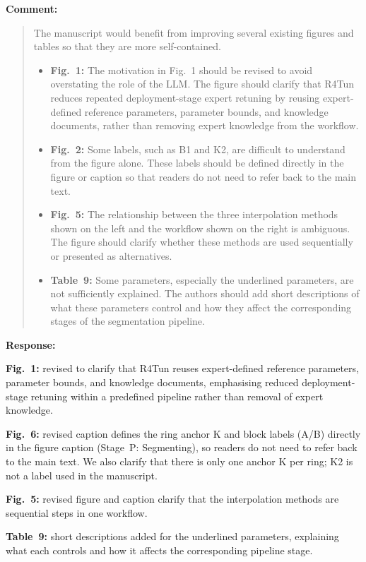 \documentclass[11pt,a4paper]{article}
\newcommand{\MSCriticalParamsTable}{Table~9}
\newenvironment{commentblock}{%
  \par\smallskip\noindent\textbf{Comment:}\par
  \begin{quote}\itshape\color{black}
}{%
  \end{quote}\smallskip
}
\newenvironment{responseblock}{%
  \par\smallskip\noindent\textbf{Response:}\par
  \begingroup\color{responsegreen}
}{%
  \endgroup\smallskip
}
\begin{document}
\begin{commentblock}
The manuscript would benefit from improving several existing figures and tables so that they are more self-contained.
\begin{itemize}[nosep]
  \item \textbf{Fig.~1:} The motivation in Fig.~1 should be revised to avoid overstating the role of the LLM. The figure should clarify that R4Tun reduces repeated deployment-stage expert retuning by reusing expert-defined reference parameters, parameter bounds, and knowledge documents, rather than removing expert knowledge from the workflow.
  \item \textbf{Fig.~2:} Some labels, such as B1 and K2, are difficult to understand from the figure alone. These labels should be defined directly in the figure or caption so that readers do not need to refer back to the main text.
  \item \textbf{Fig.~5:} The relationship between the three interpolation methods shown on the left and the workflow shown on the right is ambiguous. The figure should clarify whether these methods are used sequentially or presented as alternatives.
  \item \textbf{\MSCriticalParamsTable:} Some parameters, especially the underlined parameters, are not sufficiently explained. The authors should add short descriptions of what these parameters control and how they affect the corresponding stages of the segmentation pipeline.
\end{itemize}
\end{commentblock}
\begin{responseblock}
\textbf{Fig.~1:} revised to clarify that R4Tun reuses expert-defined reference parameters, parameter bounds, and knowledge documents, emphasising reduced deployment-stage retuning within a predefined pipeline rather than removal of expert knowledge.

\textbf{Fig.~6:} revised caption defines the ring anchor K and block labels (A/B) directly in the figure caption (Stage~P: Segmenting), so readers do not need to refer back to the main text. We also clarify that there is only one anchor K per ring; K2 is not a label used in the manuscript.

\textbf{Fig.~5:} revised figure and caption clarify that the interpolation methods are sequential steps in one workflow.

\textbf{\MSCriticalParamsTable:} short descriptions added for the underlined parameters, explaining what each controls and how it affects the corresponding pipeline stage.
\end{responseblock}
\end{document}
